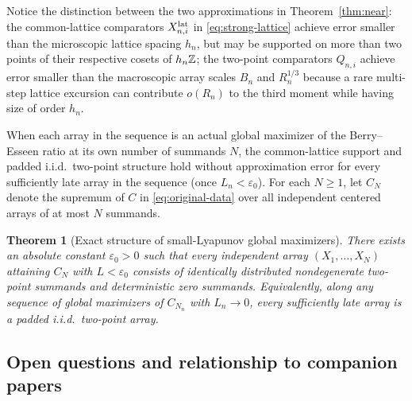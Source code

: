 \documentclass[11pt]{article}
\numberwithin{equation}{section}
\newtheorem{theorem}{Theorem}[section]
\theoremstyle{remark}\newtheorem{remark}[theorem]{Remark}
\begin{document}
Notice the distinction between the two approximations in Theorem~\ref{thm:near}:
the common-lattice comparators $X_{n,i}^{\rm lat}$ in \eqref{eq:strong-lattice}
achieve error smaller than the microscopic lattice spacing $h_n$, but may be
supported on more than two points of their respective cosets of $h_n\mathbb Z$; the
two-point comparators $Q_{n,i}$ achieve error smaller than the macroscopic
array scales $B_n$ and $R_n^{1/3}$ because a rare multi-step lattice
excursion can contribute $o(R_n)$ to the third moment while having size of
order $h_n$.

When each array in the sequence is an actual global maximizer of the
Berry--Esseen ratio at its own number of summands $N$, the common-lattice
support and padded i.i.d.\ two-point structure hold without approximation
error for every sufficiently late array in the sequence (once
$L_n<\varepsilon_0$).
For each $N\ge1$, let $C_N$ denote the supremum
of $C$ in \eqref{eq:original-data} over all independent centered arrays of at
most $N$ summands.

\begin{theorem}[Exact structure of small-Lyapunov global maximizers]\label{thm:global}
There exists an absolute constant $\varepsilon_0>0$ such that every
independent array $(X_1,\ldots,X_N)$ attaining $C_N$ with $L<\varepsilon_0$
consists of identically distributed nondegenerate two-point summands and
deterministic zero summands. Equivalently, along any sequence of global
maximizers of $C_{N_n}$ with $L_n\to0$, every sufficiently late array is a
padded i.i.d.\ two-point array.
\end{theorem}

\subsection{Open questions and relationship to companion papers}
\end{document}
